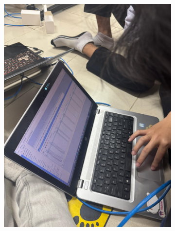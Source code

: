 \begin{figure}[H]
	\centering
	\begin{subfigure}[b]{0.4\linewidth}
		\centering
		\includegraphics[width=\linewidth]{P3/img/dokum 3.jpg}
	\end{subfigure}
	\begin{subfigure}[b]{0.4\linewidth}
		\centering

\end{subfigure}
\end{figure}
